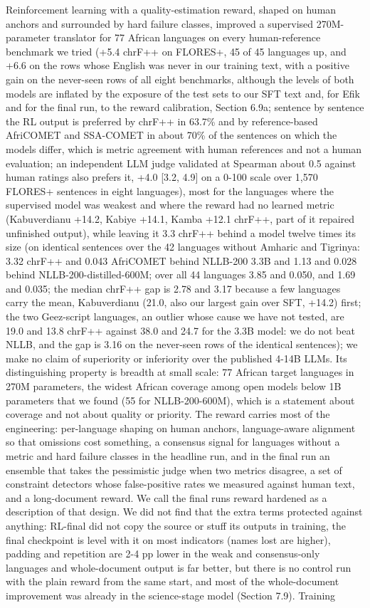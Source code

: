 Reinforcement learning with a quality-estimation reward, shaped on human anchors and surrounded by hard failure classes, improved a supervised 270M-parameter translator for 77 African languages on every human-reference benchmark we tried (+5.4 chrF++ on FLORES+, 45 of 45 languages up, and +6.6 on the rows whose English was never in our training text, with a positive gain on the never-seen rows of all eight benchmarks, although the levels of both models are inflated by the exposure of the test sets to our SFT text and, for Efik and for the final run, to the reward calibration, Section 6.9a; sentence by sentence the RL output is preferred by chrF++ in 63.7\% and by reference-based AfriCOMET and SSA-COMET in about 70\% of the sentences on which the models differ, which is metric agreement with human references and not a human evaluation; an independent LLM judge validated at Spearman about 0.5 against human ratings also prefers it, +4.0 {[}3.2, 4.9{]} on a 0-100 scale over 1,570 FLORES+ sentences in eight languages), most for the languages where the supervised model was weakest and where the reward had no learned metric (Kabuverdianu +14.2, Kabiye +14.1, Kamba +12.1 chrF++, part of it repaired unfinished output), while leaving it 3.3 chrF++ behind a model twelve times its size (on identical sentences over the 42 languages without Amharic and Tigrinya: 3.32 chrF++ and 0.043 AfriCOMET behind NLLB-200 3.3B and 1.13 and 0.028 behind NLLB-200-distilled-600M; over all 44 languages 3.85 and 0.050, and 1.69 and 0.035; the median chrF++ gap is 2.78 and 3.17 because a few languages carry the mean, Kabuverdianu (21.0, also our largest gain over SFT, +14.2) first; the two Ge\textquotesingle ez-script languages, an outlier whose cause we have not tested, are 19.0 and 13.8 chrF++ against 38.0 and 24.7 for the 3.3B model: we do not beat NLLB, and the gap is 3.16 on the never-seen rows of the identical sentences); we make no claim of superiority or inferiority over the published 4-14B LLMs. Its distinguishing property is breadth at small scale: 77 African target languages in 270M parameters, the widest African coverage among open models below 1B parameters that we found (55 for NLLB-200-600M), which is a statement about coverage and not about quality or priority. The reward carries most of the engineering: per-language shaping on human anchors, language-aware alignment so that omissions cost something, a consensus signal for languages without a metric and hard failure classes in the headline run, and in the final run an ensemble that takes the pessimistic judge when two metrics disagree, a set of constraint detectors whose false-positive rates we measured against human text, and a long-document reward. We call the final run\textquotesingle s reward hardened as a description of that design. We did not find that the extra terms protected against anything: RL-final did not copy the source or stuff its outputs in training, the final checkpoint is level with it on most indicators (names lost are higher), padding and repetition are 2-4 pp lower in the weak and consensus-only languages and whole-document output is far better, but there is no control run with the plain reward from the same start, and most of the whole-document improvement was already in the science-stage model (Section 7.9). Training 